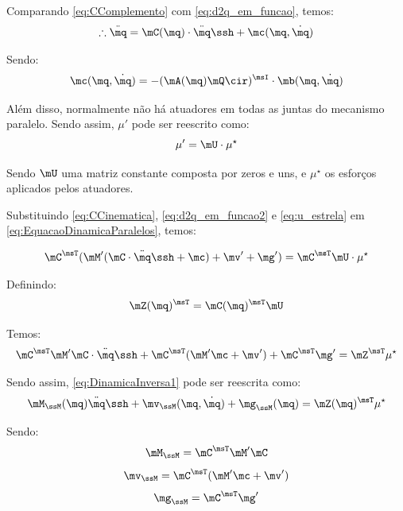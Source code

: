 \documentclass[]{politex}
\begin{document}
Comparando \eqref{eq:CComplemento} com \eqref{eq:d2q_em_funcao}, temos:
\begin{equation} \label{eq:d2q_em_funcao2}
\therefore \ddot{\mq} = \mC(\mq) \cdot \ddot{\mq}\ssh + \mc(\mq, \dot{\mq})
\end{equation}

Sendo:
\begin{equation}
\mc(\mq, \dot{\mq}) = - (\mA(\mq) \mQ\cir)^\msI \cdot \mb(\mq,\dot{\mq})
\end{equation}

Além disso, normalmente não há atuadores em todas as juntas do mecanismo paralelo. Sendo assim, $\mu'$ pode ser reescrito como:
\begin{equation} \label{eq:u_estrela}
\mu' = \mU \cdot \mu^\star
\end{equation}

Sendo $\mU$ uma matriz constante composta por zeros e uns, e $\mu^\star$ os esforços aplicados pelos atuadores.

Substituindo \eqref{eq:CCinematica}, \eqref{eq:d2q_em_funcao2} e \eqref{eq:u_estrela} em \eqref{eq:EquacaoDinamicaParalelos}, temos:

\begin{equation}
\mC^\msT ( \mM' (\mC \cdot \ddot{\mq}\ssh + \mc) + \mv' + \mg') = \mC^\msT \mU \cdot \mu^\star
\end{equation}

Definindo:
\begin{equation}
\mZ(\mq)^\msT = \mC(\mq)^\msT \mU
\end{equation}

Temos:
\begin{equation} \label{eq:DinamicaInversa1}
\mC^\msT \mM' \mC \cdot \ddot{\mq}\ssh + \mC^\msT (   \mM' \mc + \mv' ) + \mC^\msT \mg'  = \mZ^\msT \mu^\star
\end{equation}

Sendo assim, \eqref{eq:DinamicaInversa1} pode ser reescrita como:
\begin{equation} \label{eq:DinamicaInversa2}
\mM_{\ssM} (\mq) \ddot{\mq}\ssh + \mv_{\ssM}(\mq, \dot{\mq}) + \mg_{\ssM}(\mq)   = \mZ(\mq)^{\msT} \mu^\star
\end{equation}

Sendo: 
\begin{equation}
\mM_{\ssM}  =  \mC^\msT \mM' \mC
\end{equation}
\begin{equation}
\mv_{\ssM}  =  \mC^\msT (  \mM'  \mc  + \mv' )
\end{equation}
\begin{equation}
\mg_{\ssM}  = \mC^\msT \mg'
\end{equation}
\end{document}
